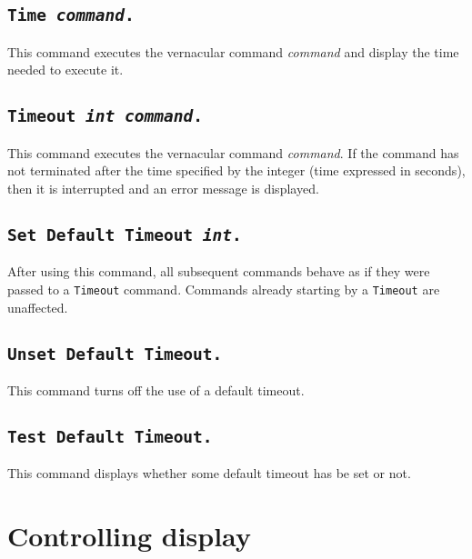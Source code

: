 \subsection[\tt Time \textrm{\textsl{command}}.]{\tt Time \textrm{\textsl{command}}.
\label{time}}
This command executes the vernacular command \textrm{\textsl{command}}
and display the time needed to execute it.


\subsection[\tt Timeout \textrm{\textsl{int}} \textrm{\textsl{command}}.]{\tt Timeout \textrm{\textsl{int}} \textrm{\textsl{command}}.
\label{timeout}}

This command executes the vernacular command \textrm{\textsl{command}}. If
the command has not terminated after the time specified by the integer
(time expressed in seconds), then it is interrupted and an error message
is displayed.

\subsection[\tt Set Default Timeout \textrm{\textsl{int}}.]{\tt Set
  Default Timeout \textrm{\textsl{int}}.}

After using this command, all subsequent commands behave as if they
were passed to a {\tt Timeout} command. Commands already starting by
a {\tt Timeout} are unaffected.

\subsection[\tt Unset Default Timeout.]{\tt Unset Default Timeout.}

This command turns off the use of a default timeout.

\subsection[\tt Test Default Timeout.]{\tt Test Default Timeout.}

This command displays whether some default timeout has be set or not.

\section{Controlling display}

